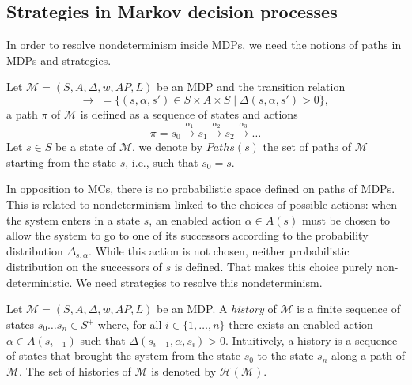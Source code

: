 \subsection{Strategies in Markov decision processes}
In order to resolve nondeterminism inside MDPs, we need the notions of paths in MDPs and strategies.
\begin{definition}
  Let $\mathcal{M}=(S, A, \Delta, w, AP, L)$ be an MDP and the transition relation
  \[\rightarrow \; =  \{ (s, \alpha, s') \in S \times A \times S \; | \; \Delta(s, \alpha, s') > 0 \}, \,\]
	a path $\pi$ of $\mathcal{M}$ is defined as a sequence of states and actions
	\[ \pi = s_0 \xrightarrow{\alpha_1} s_1 \xrightarrow{\alpha_2} s_2 \xrightarrow{\alpha_3} \dots \]
	Let $s \in S$ be a state of $\mathcal{M}$, we denote by $Paths(s)$ the set of
	paths of $\mathcal{M}$ starting from the state $s$, i.e., such that $s_0 = s$.
\end{definition}
In opposition to MCs, there is no probabilistic space defined on paths of MDPs.
This is related to nondeterminism linked to the choices of possible actions:
when the system enters in a state $s$, an enabled action $\alpha \in A(s)$ must be chosen to allow the system to go to one of its successors according to the probability distribution $\Delta_{s, \alpha}$.
While this action is not chosen, neither probabilistic distribution on the successors of $s$ is defined. That makes this choice purely non-deterministic.
We need strategies to resolve this nondeterminism.
\begin{definition}
	Let $\mathcal{M} = (S, A, \Delta, w, AP, L)$ be an MDP. A \textit{history} of $\mathcal{M}$
	is a finite sequence of states $s_0 \dots s_n \in S^+$ where, for all
	$i \in \{1, \dots, n \}$ there exists an enabled action $\alpha \in A(s_{i-1})$ such that $\Delta(s_{i-1}, \alpha, s_i) > 0$.
	Intuitively, a history is a sequence of states that brought the system from the state $s_0$ to the state $s_n$ along a path of $\mathcal{M}$. The set of histories of $\mathcal{M}$  is denoted by $\mathcal{H}(\mathcal{M})$.
\end{definition}

